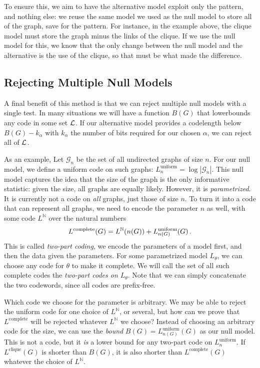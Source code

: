 \documentclass[twoside,11pt]{article}
\newcommand{\p}{\mbox{\,.}}
\newcommand{\cG}{{\mathcal G}}
\newcommand{\N}{{\mathbb N}}
\begin{document}
To ensure this, we aim to have the alternative model exploit only the pattern, and nothing else: we reuse the same model we used as the null model to store all of the graph, save for the pattern. For instance, in the example above, the clique model must store the graph minus the links of the clique. If we use the null model for this, we know that the only change between the null model and the alternative is the use of the clique, so that must be what made the difference. 

\subsection{Rejecting Multiple Null Models}

\label{section:multiplerejection}

A final benefit of this method is that we can reject multiple null models with a single test. In many situations we will have a function $B(G)$ that lowerbounds any code in some set $\cal L$. If our alternative model provides a codelength below $B(G) - k_\alpha$ with $k_\alpha$ the number of bits required for our chosen $\alpha$, we can reject all of $\cal L$.

As an example, Let $\cG_n$ be the set of all undirected graphs of size $n$. For our null model, we define a uniform code on such graphs: $L^\text{uniform}_n = \log |\cG_n|$. This null model captures the idea that the size of the graph is the only informative statistic: given the size, all graphs  are equally likely. However, it is \emph{parametrized}. It is currently not a code on \emph{all} graphs, just those of size $n$. To turn it into a code that can represent all graphs, we need to encode the parameter $n$ as well, with some code $L^\N$ over the natural numbers
\[
L^\text{complete}(G) = L^\N(n(G)) + L^\text{uniform}_{n(G)}(G) \p
\]
This is called \emph{two-part coding}, we encode the parameters of a model first, and then the data given the parameters. For some parametrized model $L_\theta$, we can choose any code for $\theta$ to make it complete. We will call the set of all such complete codes the \emph{two-part codes on $L_\theta$}. Note that we can simply concatenate the two codewords, since all codes are prefix-free.

Which code we choose for the parameter is arbitrary. We may be able to reject the uniform code for one choice of $L^\N$, or several, but how can we prove that $L^\text{complete}$ will be rejected whatever $L^\N$ we choose? Instead of choosing an arbitrary code for the size, we can use the \emph{bound} $B(G) = L^\text{uniform}_{n(G)}(G)$ as our null model. This is not a code, but it \emph{is} a lower bound for any two-part code on $L^\text{uniform}_n$. If $L^\text{clique}(G)$ is shorter than $B(G)$, it is also shorter than $L^\text{complete}(G)$ whatever the choice of $L^\N$.\footnotemark
\end{document}
